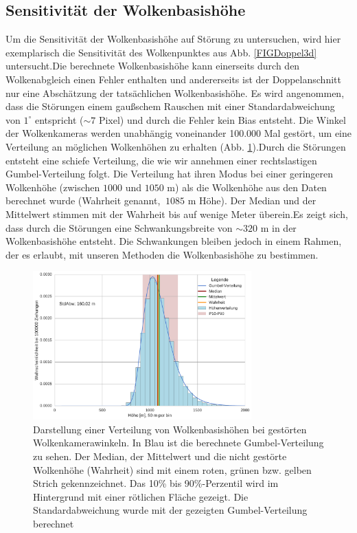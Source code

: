 \documentclass[a4paper,11pt,twoside,german]{article}
\newcommand{\absatz}{\smallbreak}
\begin{document}
\subsection{Sensitivität der Wolkenbasishöhe}
\label{SECSens}
Um die Sensitivität der Wolkenbasishöhe auf Störung zu untersuchen, wird hier
exemplarisch die Sensitivität des Wolkenpunktes aus Abb. \ref{FIGDoppel3d}
untersucht.\absatz Die berechnete Wolkenbasishöhe kann einerseits durch den
Wolkenabgleich einen Fehler enthalten und andererseits ist der Doppelanschnitt
nur eine Abschätzung der tatsächlichen Wolkenbasishöhe.  Es wird angenommen,
dass die Störungen einem gaußschem Rauschen mit einer Standardabweichung von
$1^{\circ}$ entspricht ($\sim7$ Pixel) und durch die Fehler kein Bias entsteht.
Die Winkel der Wolkenkameras werden unabhängig voneinander 100.000 Mal gestört,
um eine Verteilung an möglichen Wolkenhöhen zu erhalten (Abb.
\ref{FIGSens}).\absatz Durch die Störungen entsteht eine schiefe Verteilung, die
wie wir annehmen einer rechtslastigen Gumbel-Verteilung folgt.  Die Verteilung
hat ihren Modus bei einer geringeren Wolkenhöhe (zwischen $1000$ und $1050$ m)
als die Wolkenhöhe aus den Daten berechnet wurde (Wahrheit genannt, $~1085$ m
Höhe). Der Median und der Mittelwert stimmen mit der Wahrheit bis auf wenige
Meter überein.\absatz Es zeigt sich, dass durch die Störungen eine
Schwankungsbreite von $\sim320$ m in der Wolkenbasishöhe entsteht. Die
Schwankungen bleiben jedoch in einem Rahmen, der es erlaubt, mit unseren
Methoden die Wolkenbasishöhe zu bestimmen.  \clearpage

\begin{figure}[h]
	\begin{center}
        \includegraphics[width=0.75\textwidth]{media/sens_prob_height.pdf}
        \caption[Wolkenhöhenverteilung von gestörten
        Wolkenkamerawinkeln]{Darstellung einer Verteilung von Wolkenbasishöhen
        bei gestörten Wolkenkamerawinkeln. In Blau ist die berechnete
        Gumbel-Verteilung zu sehen. Der Median, der Mittelwert und die nicht
        gestörte Wolkenhöhe (Wahrheit) sind mit einem roten, grünen bzw. gelben
        Strich gekennzeichnet. Das 10\% bis 90\%-Perzentil wird im Hintergrund
        mit einer rötlichen Fläche gezeigt. Die Standardabweichung wurde mit der
        gezeigten Gumbel-Verteilung berechnet} \label{FIGSens} \end{center}
        \end{figure}
\end{document}
